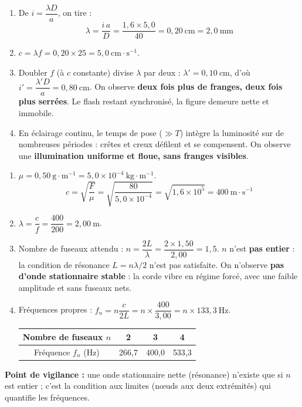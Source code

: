 \documentclass[11pt]{article}
\begin{document}
\begin{corrige}
\begin{enumerate}
    \item De $i = \dfrac{\lambda D}{a}$, on tire :
    \[
    \lambda = \frac{i\,a}{D} = \frac{1{,}6 \times 5{,}0}{40} = 0{,}20\ \text{cm} = 2{,}0\ \text{mm}
    \]
    \item $c = \lambda f = 0{,}20 \times 25 = 5{,}0\ \text{cm}\cdot\text{s}^{-1}$.
    \item Doubler $f$ (à $c$ constante) divise $\lambda$ par deux : $\lambda' = 0{,}10\ \text{cm}$, d'où $i' = \dfrac{\lambda' D}{a} = 0{,}80\ \text{cm}$. On observe \textbf{deux fois plus de franges, deux fois plus serrées}. Le flash restant synchronisé, la figure demeure nette et immobile.
    \item En éclairage continu, le temps de pose ($\gg T$) intègre la luminosité sur de nombreuses périodes : crêtes et creux défilent et se compensent. On observe une \textbf{illumination uniforme et floue, sans franges visibles}.
\end{enumerate}
\end{corrige}

\begin{corrige}
\begin{enumerate}
    \item $\mu = 0{,}50\ \text{g}\cdot\text{m}^{-1} = 5{,}0 \times 10^{-4}\ \text{kg}\cdot\text{m}^{-1}$.
    \[
    c = \sqrt{\frac{F}{\mu}} = \sqrt{\frac{80}{5{,}0 \times 10^{-4}}} = \sqrt{1{,}6 \times 10^{5}} = 400\ \text{m}\cdot\text{s}^{-1}
    \]
    \item $\lambda = \dfrac{c}{f} = \dfrac{400}{200} = 2{,}00\ \text{m}$.
    \item Nombre de fuseaux attendu : $n = \dfrac{2L}{\lambda} = \dfrac{2 \times 1{,}50}{2{,}00} = 1{,}5$.
    $n$ n'est \textbf{pas entier} : la condition de résonance $L = n\lambda/2$ n'est pas satisfaite. On n'observe \textbf{pas d'onde stationnaire stable} : la corde vibre en régime forcé, avec une faible amplitude et sans fuseaux nets.
    \item Fréquences propres : $f_n = n\dfrac{c}{2L} = n \times \dfrac{400}{3{,}00} = n \times 133{,}3\ \text{Hz}$.
    \begin{center}
    \begin{tabular}{|c|c|c|c|}\hline
    \rowcolor{popblueL} Nombre de fuseaux $n$ & 2 & 3 & 4 \\ \hline
    Fréquence $f_n$ (Hz) & 266{,}7 & 400{,}0 & 533{,}3 \\ \hline
    \end{tabular}
    \end{center}
\end{enumerate}
\textbf{Point de vigilance :} une onde stationnaire nette (résonance) n'existe que si $n$ est entier ; c'est la condition aux limites (nœuds aux deux extrémités) qui quantifie les fréquences.
\end{corrige}
\end{document}
